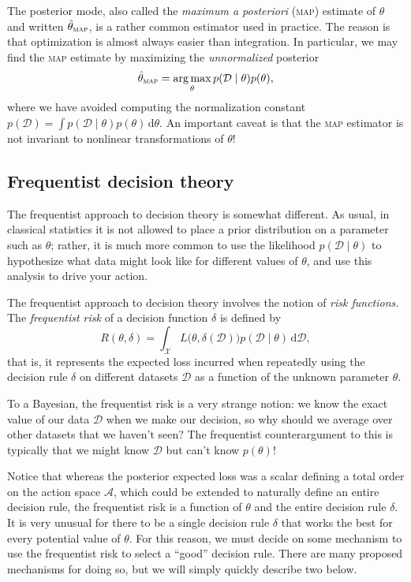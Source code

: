 \documentclass{article}
\newcommand{\acro}[1]{\textsc{\MakeLowercase{#1}}}
\newcommand{\given}{\mid}
\newcommand{\mc}[1]{\mathcal{#1}}
\newcommand{\data}{\mc{D}}
\newcommand{\intd}[1]{\,\mathrm{d}{#1}}
\DeclareMathOperator*{\argmax}{arg\,max}
\begin{document}
The posterior mode, also called the \emph{maximum a posteriori}
(\acro{MAP}) estimate of $\theta$ and written
$\hat{\theta}_{\text{\acro{MAP}}}$, is a rather common estimator used
in practice.  The reason is that optimization is almost always easier
than integration.  In particular, we may find the \acro{MAP} estimate
by maximizing the \emph{unnormalized} posterior
\begin{equation*}
  \hat{\theta}_{\text{\acro{MAP}}}
  =
  \argmax_\theta
  p(\data \given \theta)p(\theta),
\end{equation*}
where we have avoided computing the normalization constant $p(\data) =
\int p(\data \given \theta) p(\theta) \intd{\theta}.$ An important
caveat is that the \acro{MAP} estimator is not invariant to nonlinear
transformations of $\theta$!

\subsection*{Frequentist decision theory}

The frequentist approach to decision theory is somewhat different.  As
usual, in classical statistics it is not allowed to place a prior
distribution on a parameter such as $\theta$; rather, it is much more
common to use the likelihood $p(\data \given \theta)$ to hypothesize
what data might look like for different values of $\theta$, and use
this analysis to drive your action.

The frequentist approach to decision theory involves the notion of
\emph{risk functions.}  The \emph{frequentist risk} of a decision
function $\delta$ is defined by
\begin{equation*}
  R(\theta, \delta)
  =
  \int_{\mc{X}}
  L\bigl(\theta, \delta(\data)\bigr)
  p(\data \given \theta)
  \intd{\data},
\end{equation*}
that is, it represents the expected loss incurred when repeatedly
using the decision rule $\delta$ on different datasets $\data$ as a
function of the unknown parameter $\theta$.

To a Bayesian, the frequentist risk is a very strange notion: we know
the exact value of our data $\data$ when we make our decision, so why
should we average over other datasets that we haven't seen?  The
frequentist counterargument to this is typically that we might know
$\data$ but can't know $p(\theta)$!

Notice that whereas the posterior expected loss was a scalar defining
a total order on the action space $\mc{A}$, which could be extended to
naturally define an entire decision rule, the frequentist risk is a
function of $\theta$ and the entire decision rule $\delta$.  It is
very unusual for there to be a single decision rule $\delta$ that
works the best for every potential value of $\theta$.  For this
reason, we must decide on some mechanism to use the frequentist risk
to select a ``good'' decision rule.  There are many proposed
mechanisms for doing so, but we will simply quickly describe two
below.
\end{document}

